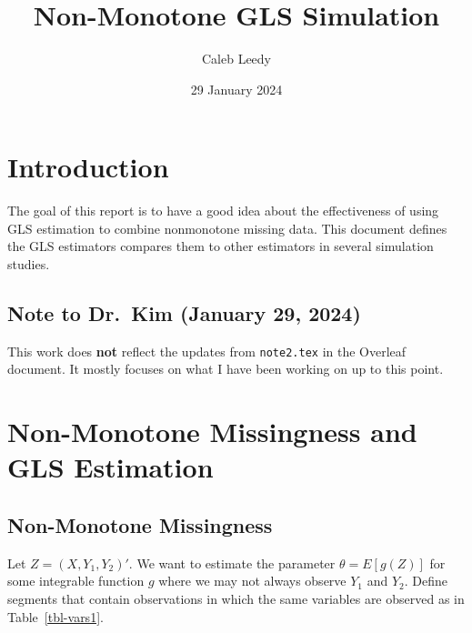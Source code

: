\documentclass[
  letterpaper,
  DIV=11,
  numbers=noendperiod]{scrartcl}
\title{Non-Monotone GLS Simulation}
\author{Caleb Leedy}
\date{29 January 2024}
\begin{document}
\maketitle
\ifdefined\Shaded\renewenvironment{Shaded}{\begin{tcolorbox}[enhanced, frame hidden, sharp corners, interior hidden, boxrule=0pt, breakable, borderline west={3pt}{0pt}{shadecolor}]}{\end{tcolorbox}}\fi

\hypertarget{introduction}{%
\section{Introduction}\label{introduction}}

The goal of this report is to have a good idea about the effectiveness
of using GLS estimation to combine nonmonotone missing data. This
document defines the GLS estimators compares them to other estimators in
several simulation studies.

\hypertarget{note-to-dr.-kim-january-29-2024}{%
\subsection{Note to Dr.~Kim (January 29,
2024)}\label{note-to-dr.-kim-january-29-2024}}

This work does \textbf{not} reflect the updates from \texttt{note2.tex}
in the Overleaf document. It mostly focuses on what I have been working
on up to this point.

\hypertarget{non-monotone-missingness-and-gls-estimation}{%
\section{Non-Monotone Missingness and GLS
Estimation}\label{non-monotone-missingness-and-gls-estimation}}

\hypertarget{non-monotone-missingness}{%
\subsection{Non-Monotone Missingness}\label{non-monotone-missingness}}

Let \(Z = (X, Y_1, Y_2)'\). We want to estimate the parameter
\(\theta = E[g(Z)]\) for some integrable function \(g\) where we may not
always observe \(Y_1\) and \(Y_2\). Define segments that contain
observations in which the same variables are observed as in
Table~\ref{tbl-vars1}.
\end{document}
